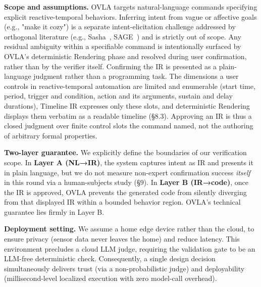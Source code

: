 \documentclass[sigconf,nonacm,anonymous,review]{acmart}
\begin{document}
\textbf{Scope and assumptions.} 
OVLA targets natural-language commands specifying explicit reactive-temporal behaviors. Inferring intent from vague or affective goals (e.g., "make it cozy") is a separate intent-elicitation challenge addressed by orthogonal literature (e.g., Sasha~\cite{sasha}, SAGE~\cite{sage}) and is strictly out of scope. Any residual ambiguity within a specifiable command is intentionally surfaced by OVLA's deterministic Rendering phase and resolved during user confirmation, rather than by the verifier itself. 
Confirming the IR is presented as a plain-language judgment rather than a programming task. The dimensions a user controls in reactive-temporal automation are limited and enumerable (start time, period, trigger and condition, action and its arguments, sustain and delay durations), Timeline IR expresses only these slots, and deterministic Rendering displays them verbatim as a readable timeline (\S8.3). Approving an IR is thus a closed judgment over finite control slots the command named, not the authoring of arbitrary formal properties.

\textbf{Two-layer guarantee.} We explicitly define the boundaries of our verification scope. %
In \textbf{Layer A (NL→IR)}, the system captures intent as IR and presents it in plain language, but we do not measure non-expert confirmation success \emph{itself} in this round via a human-subjects study (\S9). In \textbf{Layer B (IR→code)}, once the IR is approved, OVLA prevents the generated code from silently diverging from that displayed IR within a bounded behavior region. OVLA's technical guarantee lies firmly in Layer B.

\textbf{Deployment setting.} We assume a home edge device rather than the cloud, to ensure privacy (sensor data never leaves the home) and reduce latency. %
This environment precludes a cloud LLM judge, requiring the validation gate to be an LLM-free deterministic check. Consequently, a single design decision simultaneously delivers trust (via a non-probabilistic judge) and deployability (millisecond-level localized execution with zero model-call overhead).
\end{document}
